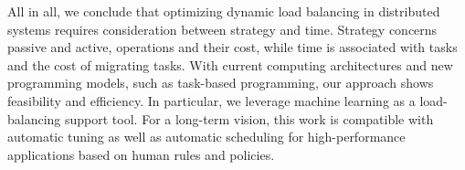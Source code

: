 
All in all, we conclude that optimizing dynamic load balancing in distributed systems requires consideration between strategy and time. Strategy concerns passive and active, operations and their cost, while time is associated with tasks and the cost of migrating tasks. With current computing architectures and new programming models, such as task-based programming, our approach shows feasibility and efficiency. In particular, we leverage machine learning as a load-balancing support tool. For a long-term vision, this work is compatible with automatic tuning as well as automatic scheduling for high-performance applications based on human rules and policies.



